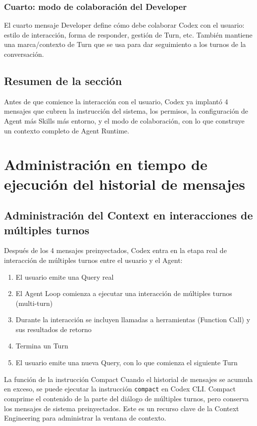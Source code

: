 \documentclass[a4paper]{article}
\begin{document}
\subsubsection{Cuarto: modo de colaboración del Developer}

El cuarto mensaje Developer define cómo debe colaborar Codex con el usuario: estilo de interacción, forma de responder, gestión de Turn, etc. También mantiene una marca/contexto de Turn que se usa para dar seguimiento a los turnos de la conversación.

\subsection{Resumen de la sección}

Antes de que comience la interacción con el usuario, Codex ya implantó 4 mensajes que cubren la instrucción del sistema, los permisos, la configuración de Agent más Skills más entorno, y el modo de colaboración, con lo que construye un contexto completo de Agent Runtime.
\section{Administración en tiempo de ejecución del historial de mensajes}

\subsection{Administración del Context en interacciones de múltiples turnos}

Después de los 4 mensajes preinyectados, Codex entra en la etapa real de interacción de múltiples turnos entre el usuario y el Agent:

\begin{enumerate}
    \item El usuario emite una Query real
    \item El Agent Loop comienza a ejecutar una interacción de múltiples turnos (multi-turn)
    \item Durante la interacción se incluyen llamadas a herramientas (Function Call) y sus resultados de retorno
    \item Termina un Turn
    \item El usuario emite una nueva Query, con lo que comienza el siguiente Turn
\end{enumerate}

\begin{importantbox}{La función de la instrucción Compact}
Cuando el historial de mensajes se acumula en exceso, se puede ejecutar la instrucción \texttt{compact} en Codex CLI. Compact comprime el contenido de la parte del diálogo de múltiples turnos, pero conserva los mensajes de sistema preinyectados. Este es un recurso clave de la Context Engineering para administrar la ventana de contexto.
\end{importantbox}
\end{document}
